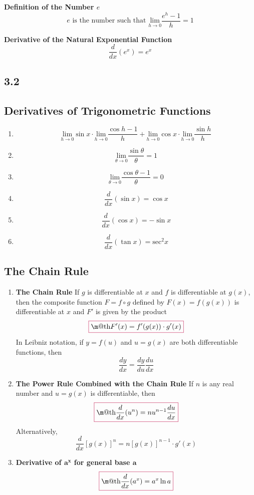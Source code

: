 \documentclass[11pt]{article}
\makeatletter
\theoremstyle{plain}
\theoremstyle{definition}
\newcommand*{\boxedcolor}{purple}
\renewcommand{\boxed}[1]{\textcolor{\boxedcolor}{%
  \fbox{\normalcolor\m@th$\displaystyle#1$}}}
\makeatother
\begin{document}
\textbf{Definition of the Number $e$}
$$e \text{ is the number such that  }\underset{h\rightarrow 0}{\text{lim}}\frac{e^h-1}{h}=1$$

\textbf{Derivative of the Natural Exponential Function}
$$\frac{d}{dx}(e^x)=e^x$$

\subsection{3.2}

\subsection{Derivatives of Trigonometric Functions}

\begin{enumerate}
	\item $$\underset{h\rightarrow 0}{\text{lim}}\sin x \cdot \underset{h\rightarrow 0}{\text{lim}}\frac{\cos h -1}{h}+\underset{h\rightarrow 0}{\text{lim}}\cos x \cdot \underset{h\rightarrow 0}{\text{lim}}\frac{\sin h}{h}$$
	\item $$\underset{\theta \rightarrow 0}{\text{lim}}\frac{\sin\theta}{\theta}=1$$
	\item $$\underset{\theta \rightarrow 0}{\text{lim}}\frac{\cos\theta-1}{\theta}=0$$
	\item $$\frac{d}{dx}(\sin x)=\cos x$$
	\item $$\frac{d}{dx}(\cos x)=-\sin x$$
	\item $$\frac{d}{dx}(\tan x)=\text{sec}^2 x$$
\end{enumerate}

\subsection{The Chain Rule}

\begin{enumerate}
	\item \textbf{The Chain Rule} If $g$ is differentiable at $x$ and $f$ is differentiable at $g(x)$, then the composite function $F=f\circ g$ defined by $F(x)=f(g(x))$ is differentiable at $x$ and $F'$ is given by the product $$\boxed{F'(x)=f'(g(x)) \cdot g'(x)}$$ In Leibniz notation, if $y=f(u)$ and $u=g(x)$ are both differentiable functions, then $$\frac{dy}{dx}=\frac{dy}{du}\frac{du}{dx}$$
	\item \textbf{The Power Rule Combined with the Chain Rule} If $n$ is any real number and $u=g(x)$ is differentiable, then $$\boxed{\frac{d}{dx}(u^n)=nu^{n-1}\frac{du}{dx}}$$ Alternatively, $$\frac{d}{dx}[g(x)]^n=n[g(x)]^{n-1}\cdot g'(x)$$
	\item \textbf{Derivative of $\boldsymbol{a^x}$ for general base $\boldsymbol{a}$} $$\boxed{\frac{d}{dx}(a^x)=a^x\ln a}$$
\end{enumerate}
\end{document}

